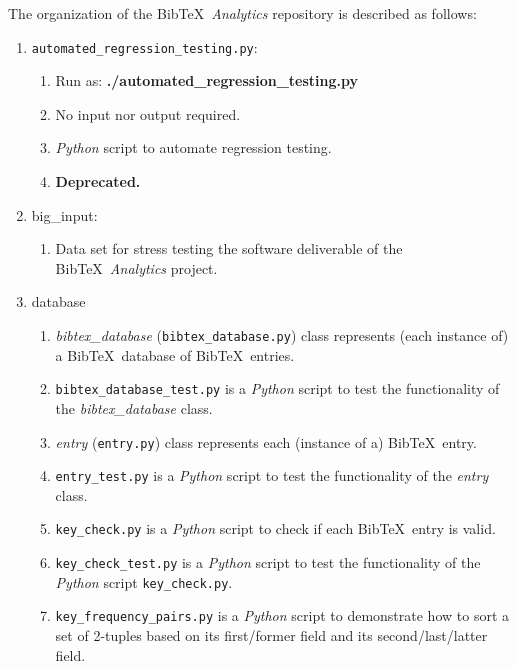 The organization of the {\sc Bib}\TeX\ {\it Analytics} repository is described as follows: \vspace{-0.3cm}
\begin{enumerate} \itemsep -4pt
\item {\tt automated\_regression\_testing.py}: \vspace{-0.3cm}
	\begin{enumerate} \itemsep -2pt
	\item Run as: {\bf ./automated\_regression\_testing.py}
	\item No input nor output required.
	\item {\it Python} script to automate regression testing.
	\item {\bf Deprecated.}
	\end{enumerate}
\item big\_input: \vspace{-0.3cm}
	\begin{enumerate} \itemsep -2pt
	\item Data set for stress testing the software deliverable of the {\sc Bib}\TeX\ {\it Analytics} project.
	\end{enumerate}
\item database \vspace{-0.3cm}
	\begin{enumerate} \itemsep -2pt
	\item {\it bibtex\_database} ({\tt bibtex\_database.py}) class represents (each instance of) a {\sc Bib}\TeX\ database of {\sc Bib}\TeX\ entries.
	\item {\tt bibtex\_database\_test.py} is a {\it Python} script to test the functionality of the {\it bibtex\_database} class.
	\item {\it entry} ({\tt entry.py}) class represents each (instance of a) {\sc Bib}\TeX\ entry.
	\item {\tt entry\_test.py} is a {\it Python} script to test the functionality of the {\it entry} class.
	\item {\tt key\_check.py} is a {\it Python} script to check if each {\sc Bib}\TeX\ entry is valid.
	\item {\tt key\_check\_test.py} is a {\it Python} script to test the functionality of the {\it Python} script {\tt key\_check.py}.
	\item {\tt key\_frequency\_pairs.py} is a {\it Python} script to demonstrate how to sort a set of 2-tuples based on its first/former field and its second/last/latter field.
	\end{enumerate}

\end{enumerate}
